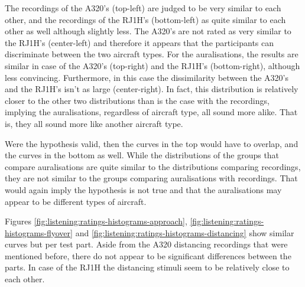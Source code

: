 The recordings of the A320's (top-left) are judged to be very similar to each other, and
the recordings of the RJ1H's (bottom-left) as quite similar to each other as well although
slightly less. The A320's are not rated as very similar to the RJ1H's (center-left) and
therefore it appears that the participants can discriminate between the two
aircraft types.
For the auralisations, the results are similar in case of the A320's (top-right)
and the RJ1H's (bottom-right), although less convincing. Furthermore, in this case the
dissimilarity between the A320's and the RJ1H's isn't as large (center-right). In fact, this
distribution is relatively closer to the other two distributions than is the
case with the recordings, implying the auralisations, regardless of aircraft
type, all sound more alike. That is, they all sound more like another aircraft type.

%

Were the hypothesis valid, then the curves in the top would have to overlap, and
the curves in the bottom as well. While the distributions of the groups that
compare auralisations are quite similar to the distributions comparing
recordings, they are not similar to the groups comparing auralisations with
recordings. That would again imply the hypothesis is not true and that the
auralisations may appear to be different types of aircraft.


Figures \ref{fig:listening:ratings-histograms-approach},
\ref{fig:listening:ratings-histograms-flyover} and
\ref{fig:listening:ratings-histograms-distancing} show similar curves but per
test part. Aside from the A320 distancing recordings that were mentioned before,
there do not appear to be significant differences between the parts.
In case of the RJ1H the distancing stimuli seem to be relatively close to each other.


